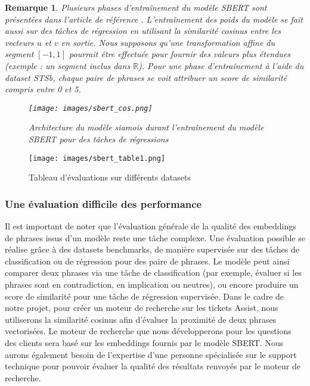 \documentclass[12pt]{article}
\newtheorem{rmq}{Remarque}
\theoremstyle{definition}
\begin{document}
\newpage
\begin{rmq}
	Plusieurs phases d’entraînement du modèle SBERT sont présentées dans l’article de référence \cite{sbert}. L'entraînement des poids du modèle se fait aussi sur des tâches de régression en utilisant la similarité cosinus entre les vecteurs $u$ et $v$ en sortie. Nous supposons qu’une transformation affine du segment $[-1, 1]$ pourrait être effectuée pour fournir des valeurs plus étendues (exemple : un segment inclus dans $\mathbb{R}$). Pour une phase d’entraînement à l’aide du dataset STSb, chaque paire de phrases se voit attribuer un score de similarité compris entre 0 et 5.
	
	
	\begin{figure*}[!h]
		\centering
		\texttt{[image: images/sbert\_cos.png]}
		\caption{Architecture du modèle siamois durant l'entraînement du modèle SBERT pour des tâches de régressions \cite{sbert}}
	\end{figure*}
\end{rmq}


\begin{figure*}[!h]
	\centering
	\texttt{[image: images/sbert\_table1.png]}
	\caption{Tableau d'évaluations sur différents datasets \cite{sts}}
\end{figure*}

\subsubsection{Une évaluation difficile des performance}
Il est important de noter que l'évaluation générale de la qualité des embeddings de phrases issus d'un modèle reste une tâche complexe. Une évaluation possible se réalise grâce à des datasets benchmarks, de manière supervisée sur des tâches de classification ou de régression pour des paire de phrases. Le modèle peut ainsi comparer deux phrases via une tâche de classification (par exemple, évaluer si les phrases sont en contradiction, en implication ou neutres), ou encore produire un score de similarité pour une tâche de régression supervisée. Dans le cadre de notre projet, pour créer un moteur de recherche sur les tickets Assist, nous utiliserons la similarité cosinus afin d'évaluer la proximité de deux phrases vectorisées. Le moteur de recherche que nous développerons pour les questions des clients sera basé sur les embeddings fournis par le modèle SBERT. Nous aurons également besoin de l'expertise d'une personne spécialisée sur le support technique pour pouvoir évaluer la qualité des résultats renvoyés par le moteur de recherche.
\end{document}
